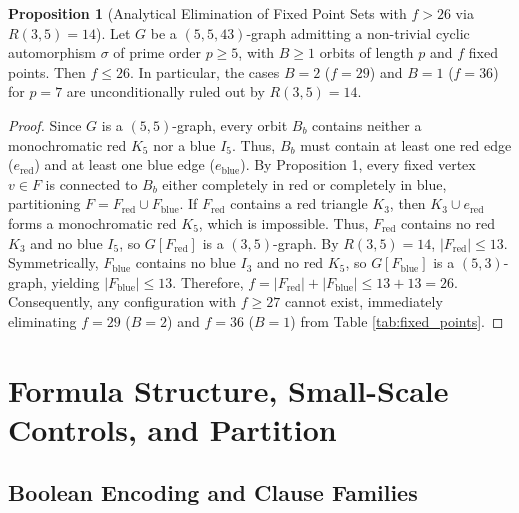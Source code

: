 \documentclass[11pt,a4paper]{article}
\theoremstyle{definition}
\newtheorem{proposition}{Proposition}
\begin{document}
\begin{proposition}[Analytical Elimination of Fixed Point Sets with $f > 26$ via $R(3,5)=14$]
\label{prop:fixed_points_bound}
Let $G$ be a $(5,5,43)$-graph admitting a non-trivial cyclic automorphism $\sigma$ of prime order $p \ge 5$, with $B \ge 1$ orbits of length $p$ and $f$ fixed points. Then $f \le 26$. In particular, the cases $B=2$ ($f=29$) and $B=1$ ($f=36$) for $p=7$ are unconditionally ruled out by $R(3,5)=14$.
\end{proposition}
\begin{proof}
Since $G$ is a $(5,5)$-graph, every orbit $B_b$ contains neither a monochromatic red $K_5$ nor a blue $I_5$. Thus, $B_b$ must contain at least one red edge ($e_{\text{red}}$) and at least one blue edge ($e_{\text{blue}}$). 
By Proposition 1, every fixed vertex $v \in F$ is connected to $B_b$ either completely in red or completely in blue, partitioning $F = F_{\text{red}} \cup F_{\text{blue}}$.
If $F_{\text{red}}$ contains a red triangle $K_3$, then $K_3 \cup e_{\text{red}}$ forms a monochromatic red $K_5$, which is impossible. Thus, $F_{\text{red}}$ contains no red $K_3$ and no blue $I_5$, so $G[F_{\text{red}}]$ is a $(3,5)$-graph. By $R(3,5)=14$, $|F_{\text{red}}| \le 13$.
Symmetrically, $F_{\text{blue}}$ contains no blue $I_3$ and no red $K_5$, so $G[F_{\text{blue}}]$ is a $(5,3)$-graph, yielding $|F_{\text{blue}}| \le 13$.
Therefore, $f = |F_{\text{red}}| + |F_{\text{blue}}| \le 13 + 13 = 26$.
Consequently, any configuration with $f \ge 27$ cannot exist, immediately eliminating $f=29$ ($B=2$) and $f=36$ ($B=1$) from Table \ref{tab:fixed_points}.
\end{proof}

\section{Formula Structure, Small-Scale Controls, and Partition}

\subsection{Boolean Encoding and Clause Families}
\end{document}
